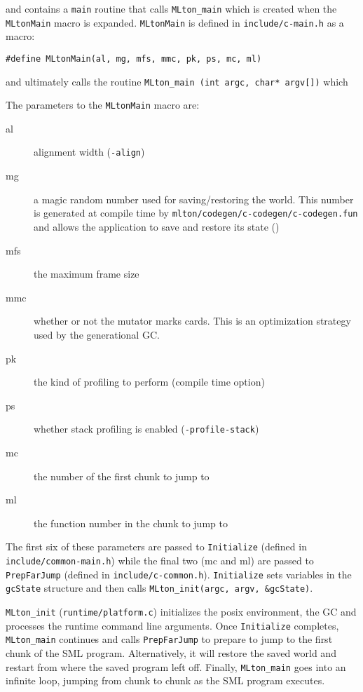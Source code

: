 \noindent and contains a \texttt{main} routine that calls \texttt{MLton\_main} which is created when the \texttt{MLtonMain} macro is expanded. 
\texttt{MLtonMain} is defined in \texttt{include/c-main.h} as a macro:

\begin{minipage}{\linewidth}
\lstset{language=C}\begin{lstlisting}
#define MLtonMain(al, mg, mfs, mmc, pk, ps, mc, ml)	
\end{lstlisting}
\end{minipage}

and ultimately calls the routine \texttt{MLton\_main (int argc, char* argv[])} which 

The parameters to the \texttt{MLtonMain} macro are:


\begin{description}
\item[al] alignment width (\texttt{-align})
\item[mg] a magic random number used for saving/restoring the world. This number is generated at compile time by \texttt{mlton/codegen/c-codegen/c-codegen.fun} and allows the application to save and restore its state ()
\item[mfs] the maximum frame size
\item[mmc] whether or not the mutator marks cards. This is an optimization strategy used by the generational GC.
\item[pk] the kind of profiling to perform (compile time option)
\item[ps] whether stack profiling is enabled (\texttt{-profile-stack})
\item[mc] the number of the first chunk to jump to
\item[ml] the function number in the chunk to jump to
\end{description}

The first six of these parameters are passed to \texttt{Initialize} (defined in \texttt{include/common-main.h}) while the final two (mc and ml) are passed to \texttt{PrepFarJump} (defined in \texttt{include/c-common.h}). 
\texttt{Initialize} sets variables in the \texttt{gcState} structure and then calls \texttt{MLton\_init(argc, argv, \&gcState)}.



\texttt{MLton\_init} (\texttt{runtime/platform.c}) initializes the posix environment, the GC and processes the runtime command line arguments.  Once \texttt{Initialize} completes, \texttt{MLton\_main} continues and calls \texttt{PrepFarJump} to prepare to jump to the first chunk of the SML program. Alternatively, it will restore the saved world and restart from where the saved program left off. Finally, \texttt{MLton\_main} goes into an infinite loop, jumping from chunk to chunk as the SML program executes.


